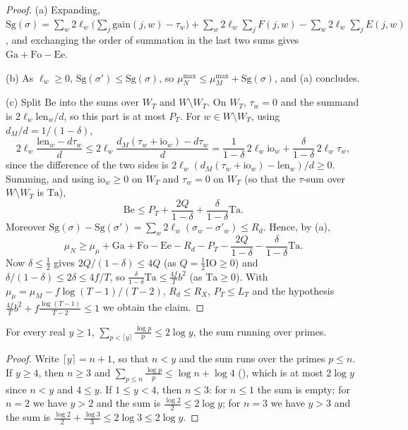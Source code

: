 \begin{proof}
(a) Expanding, $\mathrm{Sg}(\sigma)=\sum_w2\ell_w\bigl(\sum_j\mathrm{gain}(j,w)-\tau_w\bigr)+\sum_w2\ell_w\sum_jF(j,w)
-\sum_w2\ell_w\sum_jE(j,w)$, and exchanging the order of summation in the last two sums gives
$\mathrm{Ga}+\mathrm{Fo}-\mathrm{Ee}$.

(b) As $\ell_w\ge0$, $\mathrm{Sg}(\sigma')\le\mathrm{Sg}(\sigma)$, so
$\mu^{\max}_N\le\mu^{\max}_M+\mathrm{Sg}(\sigma)$, and (a) concludes.

(c) Split $\mathrm{Be}$ into the sums over $W_T$ and $W\setminus W_T$. On $W_T$, $\tau_w=0$ and the summand is
$2\ell_w\mathrm{len}_w/d$, so this part is at most $P_T$. For $w\in W\setminus W_T$, using $d_M/d=1/(1-\delta)$,
\[
2\ell_w\frac{\mathrm{len}_w-d\tau_w}{d}\le2\ell_w\frac{d_M(\tau_w+\mathrm{io}_w)-d\tau_w}{d}
=\frac1{1-\delta}\,2\ell_w\mathrm{io}_w+\frac\delta{1-\delta}\,2\ell_w\tau_w ,
\]
since the difference of the two sides is $2\ell_w(d_M(\tau_w+\mathrm{io}_w)-\mathrm{len}_w)/d\ge0$. Summing, and using
$\mathrm{io}_w\ge0$ on $W_T$ and $\tau_w=0$ on $W_T$ (so that the $\tau$-sum over $W\setminus W_T$ is $\mathrm{Ta}$),
\[
\mathrm{Be}\le P_T+\frac{2Q}{1-\delta}+\frac\delta{1-\delta}\mathrm{Ta}.
\]
Moreover $\mathrm{Sg}(\sigma)-\mathrm{Sg}(\sigma')=\sum_w2\ell_w(\sigma_w-\sigma'_w)\le R_d$. Hence, by (a),
\[
\mu_N\ge\mu_\mu+\mathrm{Ga}+\mathrm{Fo}-\mathrm{Ee}-R_d-P_T-\frac{2Q}{1-\delta}-\frac\delta{1-\delta}\mathrm{Ta}.
\]
Now $\delta\le\frac12$ gives $2Q/(1-\delta)\le4Q$ (as $Q=\frac12\mathrm{IO}\ge0$) and
$\delta/(1-\delta)\le2\delta\le4f/T$, so $\frac\delta{1-\delta}\mathrm{Ta}\le\frac{4f}Tb^2$ (as $\mathrm{Ta}\ge0$). With
$\mu_\mu=\mu_M-f\log(T-1)/(T-2)$, $R_d\le R_X$, $P_T\le L_T$ and the hypothesis
$\frac{4f}Tb^2+f\frac{\log(T-1)}{T-2}\le1$ we obtain the claim.
\end{proof}

\begin{lemma}\label{pf:top-shape:mertensplaces}
For every real $y\ge1$, $\sum_{p<\lceil y\rceil}\frac{\log p}p\le2\log y$, the sum running over primes.
\end{lemma}

\begin{proof}
Write $\lceil y\rceil=n+1$, so that $n<y$ and the sum runs over the primes $p\le n$. If $y\ge4$, then $n\ge3$ and
$\sum_{p\le n}\frac{\log p}p\le\log n+\log4$ (),
which is at most $2\log y$ since $n<y$ and $4\le y$. If $1\le y<4$, then $n\le3$: for $n\le1$ the sum is empty;
for $n=2$ we have $y>2$ and the sum is $\frac{\log2}2\le2\log y$; for $n=3$ we have $y>3$ and the sum is
$\frac{\log2}2+\frac{\log3}3\le2\log3\le2\log y$.
\end{proof}

